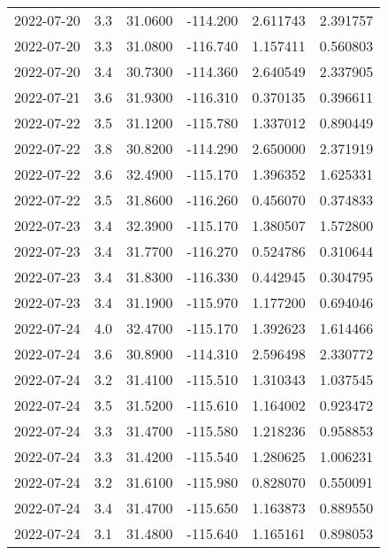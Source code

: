 \begin{tabular}{lrrrrr}
2022-07-20 &       3.3 &  31.0600 &  -114.200 &         2.611743 &         2.391757 \\
2022-07-20 &       3.3 &  31.0800 &  -116.740 &         1.157411 &         0.560803 \\
2022-07-20 &       3.4 &  30.7300 &  -114.360 &         2.640549 &         2.337905 \\
2022-07-21 &       3.6 &  31.9300 &  -116.310 &         0.370135 &         0.396611 \\
2022-07-22 &       3.5 &  31.1200 &  -115.780 &         1.337012 &         0.890449 \\
2022-07-22 &       3.8 &  30.8200 &  -114.290 &         2.650000 &         2.371919 \\
2022-07-22 &       3.6 &  32.4900 &  -115.170 &         1.396352 &         1.625331 \\
2022-07-22 &       3.5 &  31.8600 &  -116.260 &         0.456070 &         0.374833 \\
2022-07-23 &       3.4 &  32.3900 &  -115.170 &         1.380507 &         1.572800 \\
2022-07-23 &       3.4 &  31.7700 &  -116.270 &         0.524786 &         0.310644 \\
2022-07-23 &       3.4 &  31.8300 &  -116.330 &         0.442945 &         0.304795 \\
2022-07-23 &       3.4 &  31.1900 &  -115.970 &         1.177200 &         0.694046 \\
2022-07-24 &       4.0 &  32.4700 &  -115.170 &         1.392623 &         1.614466 \\
2022-07-24 &       3.6 &  30.8900 &  -114.310 &         2.596498 &         2.330772 \\
2022-07-24 &       3.2 &  31.4100 &  -115.510 &         1.310343 &         1.037545 \\
2022-07-24 &       3.5 &  31.5200 &  -115.610 &         1.164002 &         0.923472 \\
2022-07-24 &       3.3 &  31.4700 &  -115.580 &         1.218236 &         0.958853 \\
2022-07-24 &       3.3 &  31.4200 &  -115.540 &         1.280625 &         1.006231 \\
2022-07-24 &       3.2 &  31.6100 &  -115.980 &         0.828070 &         0.550091 \\
2022-07-24 &       3.4 &  31.4700 &  -115.650 &         1.163873 &         0.889550 \\
2022-07-24 &       3.1 &  31.4800 &  -115.640 &         1.165161 &         0.898053 \\

\end{tabular}
